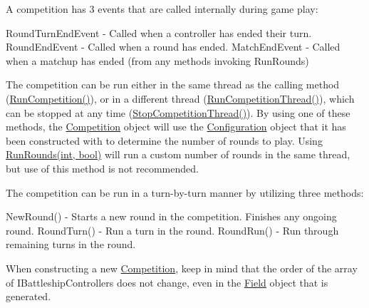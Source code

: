 A competition has 3 events that are called internally during game play\-: \begin{DoxyVerb} RoundTurnEndEvent - Called when a controller has ended their turn.
 RoundEndEvent - Called when a round has ended.
 MatchEndEvent - Called when a matchup has ended (from any methods invoking RunRounds)
\end{DoxyVerb}


The competition can be run either in the same thread as the calling method (\hyperlink{class_m_b_c_1_1_core_1_1_competition_a4b22f726ea27bfb57696f3a92a6677af}{Run\-Competition()}), or in a different thread (\hyperlink{class_m_b_c_1_1_core_1_1_competition_aa44653a37635021dadc6d5e60b8815a5}{Run\-Competition\-Thread()}), which can be stopped at any time (\hyperlink{class_m_b_c_1_1_core_1_1_competition_a45faa0917180f6a7b3520e5fedc35d9e}{Stop\-Competition\-Thread()}). By using one of these methods, the \hyperlink{class_m_b_c_1_1_core_1_1_competition}{Competition} object will use the \hyperlink{class_m_b_c_1_1_core_1_1_configuration}{Configuration} object that it has been constructed with to determine the number of rounds to play. Using \hyperlink{class_m_b_c_1_1_core_1_1_competition_ae6f1520c4f77bef9f8b9760b40517857}{Run\-Rounds(int, bool)} will run a custom number of rounds in the same thread, but use of this method is not recommended.

The competition can be run in a turn-\/by-\/turn manner by utilizing three methods\-: \begin{DoxyVerb} NewRound() - Starts a new round in the competition. Finishes any ongoing round.
 RoundTurn() - Run a turn in the round.
 RoundRun() - Run through remaining turns in the round.
\end{DoxyVerb}


When constructing a new \hyperlink{class_m_b_c_1_1_core_1_1_competition}{Competition}, keep in mind that the order of the array of I\-Battleship\-Controllers does not change, even in the \hyperlink{class_m_b_c_1_1_core_1_1_field}{Field} object that is generated. 

